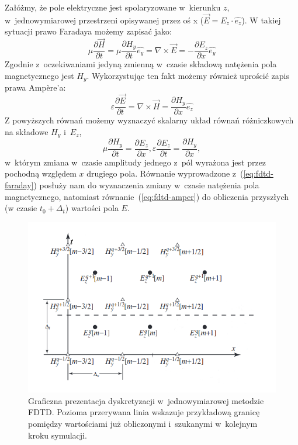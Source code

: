 Załóżmy, że pole elektryczne jest spolaryzowane w~kierunku $z$, w~jednowymiarowej przestrzeni opisywanej przez oś x ($\vec{E}=E_z \cdot \hat{e_z}$). W takiej sytuacji prawo Faradaya możemy zapisać jako:
\begin{equation}
\mu \frac{\partial \vec{H}}{\partial t}= \mu \frac{\partial H_y}{\partial t} \hat{e_y}= \nabla \times \vec{E} = - \frac{\partial E_z}{\partial x} \hat{e_y} 
\label{eq:fdtd-faraday}
\end{equation}
Zgodnie z~oczekiwaniami jedyną zmienną w~czasie składową natężenia pola magnetycznego jest $H_y$. Wykorzystując ten fakt możemy również uprościć zapis prawa Amp\`{e}re'a:
\begin{equation}
\varepsilon \frac{\partial \vec{E}}{\partial t}=\nabla \times \vec{H} = \frac{\partial H_y}{\partial x} \hat{e_z}
\label{eq:fdtd-amper}
\end{equation}
Z powyższych równań możemy wyznaczyć skalarny układ równań różniczkowych na składowe $H_y$ i~$E_z$,
\begin{equation}
\mu \frac{\partial H_y}{\partial t}=\frac{\partial E_z}{\partial x} ,
\varepsilon \frac{\partial E_z}{\partial t}=\frac{\partial H_y}{\partial x},
\end{equation} w~którym zmiana w~czasie amplitudy jednego z~pól wyrażona jest przez pochodną względem $x$ drugiego pola. Równanie wyprowadzone z~(\ref{eq:fdtd-faraday}) posłuży nam do wyznaczenia zmiany w~czasie natężenia pola magnetycznego, natomiast równanie~(\ref{eq:fdtd-amper}) do obliczenia przyszłych (w czasie $t_0 + \Delta_t$) wartości pola $E$.

\begin{figure}[tb]
\includegraphics[width=.9\textwidth]{subart/fdtd/leapfrog.png}
\caption{Graficzna prezentacja dyskretyzacji w~jednowymiarowej metodzie FDTD. Pozioma przerywana linia wskazuje przykładową granicę pomiędzy wartościami już obliczonymi i~szukanymi w~kolejnym kroku symulacji. }
\label{pic:leapfrog}
\end{figure}

